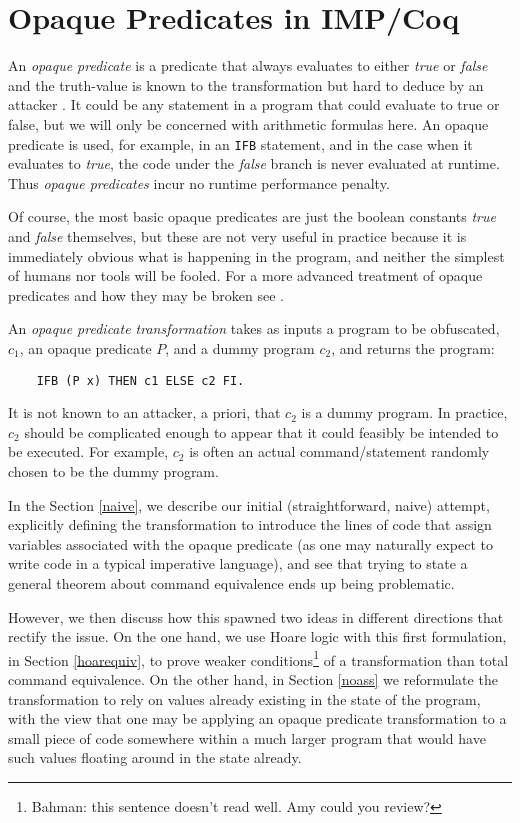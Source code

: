\documentclass[compsoc,conference,a4paper,10pt,times]{IEEEtran}
\begin{document}
\section{Opaque Predicates in IMP/Coq}
\label{sec:opaque}
An \emph{opaque predicate} \cite{CoNa} is a predicate that always evaluates to either \emph{true} or \emph{false} and the truth-value is known to the transformation but hard to deduce by an attacker \cite{Prada}. It could be any statement in a program that could evaluate to true or false, but we will only be concerned with arithmetic formulas here. An opaque predicate is used, for example, in an \texttt{IFB} statement, and in the case when it evaluates to \emph{true}, the code under the \emph{false} branch is never evaluated at runtime.  Thus \emph{opaque predicates} incur no runtime performance penalty.

Of course, the most basic opaque predicates are just the boolean constants \emph{true} and \emph{false} themselves, but these are not very useful in practice because it is immediately obvious what is happening in the program, and neither the simplest of humans nor tools will be fooled. For a more advanced treatment of opaque predicates and how they may be broken see \cite{Prada}.

An \emph{opaque predicate transformation} takes as inputs a program to be obfuscated, $c_1$, an opaque predicate $P$, and a dummy program $c_2$, and returns the program:
\begin{verbatim}
    IFB (P x) THEN c1 ELSE c2 FI.
\end{verbatim}
It is not known to an attacker, a priori, that $c_2$ is a dummy program. In practice, $c_2$ should be complicated enough to appear that it could feasibly be intended to be executed. For example, $c_2$ is often an actual command/statement randomly chosen to be the dummy program.

In the Section \ref{naive}, we describe our initial (straightforward, naive) attempt, explicitly defining the transformation to introduce the lines of code that assign variables associated with the opaque predicate (as one may naturally expect to write code in a typical imperative language), and see that trying to state a general theorem about command equivalence ends up being problematic.  

However, we then discuss how this spawned two ideas in different directions that rectify the issue.  On the one hand, we use Hoare logic with this first formulation, in Section \ref{hoarequiv}, to prove weaker conditions\footnote{Bahman: this sentence doesn't read well. Amy could you review?} of a transformation than total command equivalence.  On the other hand, in Section \ref{noass} we reformulate the transformation to rely on values already existing in the state of the program, with the view that one may be applying an opaque predicate transformation to a small piece of code somewhere within a much larger program that would have such values floating around in the state already.
\end{document}
